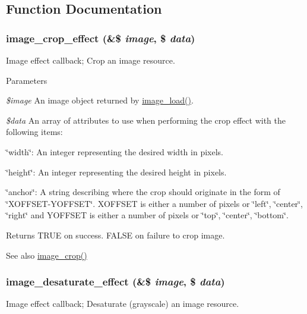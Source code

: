 \subsection{Function Documentation}
\hypertarget{image_8effects_8inc_a90a017a1639d3d79a9e76b492079279f}{
\subsubsection[{image\_\-crop\_\-effect}]{\setlength{\rightskip}{0pt plus 5cm}image\_\-crop\_\-effect (\&\$ {\em image}, \/  \$ {\em data})}}
\label{image_8effects_8inc_a90a017a1639d3d79a9e76b492079279f}
Image effect callback; Crop an image resource.


\begin{DoxyParams}{Parameters}
\item[{\em \$image}]An image object returned by \hyperlink{group__image_ga96098e5b039dc3906a656fa889a04776}{image\_\-load()}. \item[{\em \$data}]An array of attributes to use when performing the crop effect with the following items:
\begin{DoxyItemize}
\item \char`\"{}width\char`\"{}: An integer representing the desired width in pixels.
\item \char`\"{}height\char`\"{}: An integer representing the desired height in pixels.
\item \char`\"{}anchor\char`\"{}: A string describing where the crop should originate in the form of \char`\"{}XOFFSET-\/YOFFSET\char`\"{}. XOFFSET is either a number of pixels or \char`\"{}left\char`\"{}, \char`\"{}center\char`\"{}, \char`\"{}right\char`\"{} and YOFFSET is either a number of pixels or \char`\"{}top\char`\"{}, \char`\"{}center\char`\"{}, \char`\"{}bottom\char`\"{}. 
\end{DoxyItemize}\end{DoxyParams}
\begin{DoxyReturn}{Returns}
TRUE on success. FALSE on failure to crop image. 
\end{DoxyReturn}
\begin{DoxySeeAlso}{See also}
\hyperlink{group__image_gaaf7d382a8ec190f746478848ed309fe7}{image\_\-crop()} 
\end{DoxySeeAlso}
\hypertarget{image_8effects_8inc_a7952d1a3347f2974385677b80325256e}{
\subsubsection[{image\_\-desaturate\_\-effect}]{\setlength{\rightskip}{0pt plus 5cm}image\_\-desaturate\_\-effect (\&\$ {\em image}, \/  \$ {\em data})}}
\label{image_8effects_8inc_a7952d1a3347f2974385677b80325256e}
Image effect callback; Desaturate (grayscale) an image resource.


